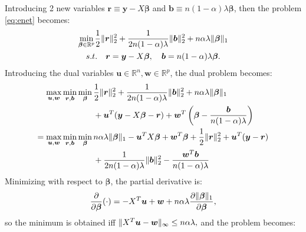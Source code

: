 Introducing 2 new variables $\boldsymbol r\equiv \boldsymbol y-X\boldsymbol\beta$ and $\boldsymbol b\equiv n(1-\alpha)\lambda \boldsymbol\beta$, then the problem \eqref{eq:enet} becomes:
\begin{equation}
    \label{eq:dual+rb}
    \begin{gathered}
    \underset{\boldsymbol\beta\in \mathbb{R}^p}{\mathrm{min}}\frac{1}{2}\lVert\boldsymbol r\rVert_2^2+\frac{1}{2n(1-\alpha)\lambda}\lVert\boldsymbol b\rVert_2^2+n\alpha\lambda\lVert\boldsymbol\beta\rVert_1\\s.t.\quad \boldsymbol r=\boldsymbol y-X\boldsymbol\beta,\quad \boldsymbol b=n(1-\alpha)\lambda \boldsymbol\beta.
\end{gathered}
\end{equation}
Introducing the dual variables $\boldsymbol u\in\mathbb{R}^{n},\boldsymbol w\in\mathbb{R}^p$, the dual problem becomes:
\begin{gather}
    \label{eq:dual+uw}
    \begin{aligned}
        \underset{\boldsymbol u,\boldsymbol w}{\mathrm{max}}\,\underset{\boldsymbol r,\boldsymbol b}{\mathrm{min}}\,\underset{\boldsymbol\beta}{\mathrm{min}}\,&\frac{1}{2}\lVert\boldsymbol r\rVert_2^2+\frac{1}{2n(1-\alpha)\lambda}\lVert\boldsymbol b\rVert_2^2+n\alpha\lambda\lVert\boldsymbol\beta\rVert_1\\
        &+\boldsymbol u^T(\boldsymbol y-X\boldsymbol\beta-\boldsymbol r)+\boldsymbol w^T\left(\boldsymbol\beta-\frac{\boldsymbol b}{n(1-\alpha)\lambda}\right)\\
        =\underset{\boldsymbol u,\boldsymbol w}{\mathrm{max}}\,\underset{\boldsymbol r,\boldsymbol b}{\mathrm{min}}\,\underset{\boldsymbol\beta}{\mathrm{min}}\,&n\alpha\lambda\lVert\boldsymbol\beta\rVert_1-\boldsymbol u^TX\boldsymbol\beta+\boldsymbol w^T\boldsymbol\beta+\frac{1}{2}\lVert\boldsymbol r\rVert_2^2+\boldsymbol u^T(\boldsymbol y-\boldsymbol r)\\
        &+\frac{1}{2n(1-\alpha)\lambda}\lVert\boldsymbol b\rVert_2^2-\frac{\boldsymbol w^T\boldsymbol b}{n(1-\alpha)\lambda}
    \end{aligned}    
\end{gather}
Minimizing with respect to $\boldsymbol\beta$, the partial derivative is:
\begin{equation}
    \label{eq:partialbeta}
    \frac{\partial}{\partial\boldsymbol\beta}(\cdot) =-X^T\boldsymbol u+\boldsymbol w+n\alpha\lambda\frac{\partial\lVert\boldsymbol\beta\rVert_1}{\partial\boldsymbol\beta},
\end{equation}
so the minimum is obtained iff $\lVert X^T\boldsymbol u-\boldsymbol w\rVert_\infty\leq n\alpha\lambda,$ and the problem becomes:
